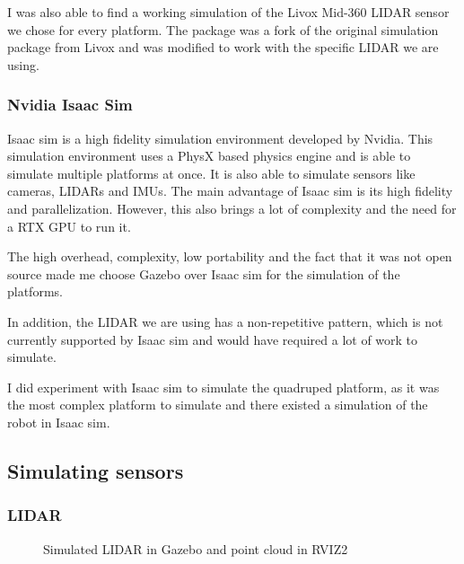 \documentclass[11pt]{article}
\begin{document}
            I was also able to find a working simulation of the Livox Mid-360 LIDAR sensor we chose for every platform. The package \cite{livox_lidar_simulation_fork} was a fork of the original simulation package from Livox \cite{livox_laser_simulation} and was modified to work with the specific LIDAR we are using. 
        \subsubsection{Nvidia Isaac Sim}

            Isaac sim is a high fidelity simulation environment developed by Nvidia. This simulation environment uses a PhysX based physics engine and is able to simulate multiple platforms at once. It is also able to simulate sensors like cameras, LIDARs and IMUs. The main advantage of Isaac sim is its high fidelity and parallelization. However, this also brings a lot of complexity and the need for a RTX GPU to run it.

            The high overhead, complexity, low portability and the fact that it was not open source made me choose Gazebo over Isaac sim for the simulation of the platforms.

            In addition, the LIDAR we are using has a non-repetitive pattern, which is not currently supported by Isaac sim and would have required a lot of work to simulate.

            I did experiment with Isaac sim to simulate the quadruped platform, as it was the most complex platform to simulate and there existed a simulation of the robot in Isaac sim.
    \subsection{Simulating sensors}
        \subsubsection{LIDAR}

        \begin{figure}[H]
            \centering
            \caption{Simulated LIDAR in Gazebo and point cloud in RVIZ2}
        \end{figure}
\end{document}
